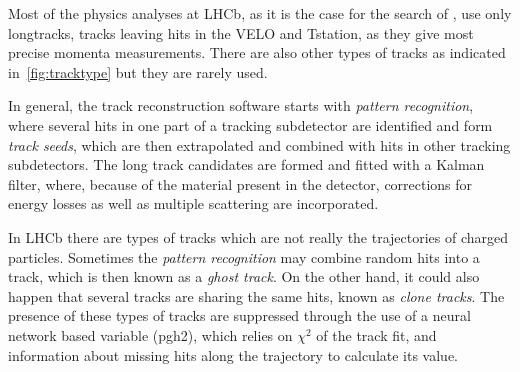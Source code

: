 Most of the physics analyses at \gls{LHCb}, as it is the case for the search of \Bmumumu, use only \gls{longtrack}s, tracks leaving hits in the \Gls{VELO} and \Gls{Tstation}, as they give most precise momenta measurements. There are also other types of tracks as indicated in~\autoref{fig:tracktype} but they are rarely used.

In general, the track reconstruction software starts with \textit{pattern recognition}, where several hits in one part of a tracking subdetector are identified and form \textit{track seeds}, which are then extrapolated and combined with hits in other tracking subdetectors. The long track candidates are formed and fitted with a Kalman filter\cite{Hierk:684697}, where, because of the material present in the detector, corrections for energy losses as well as multiple scattering are incorporated.

In \gls{LHCb} there are types of tracks which are not really the trajectories of charged particles.
Sometimes the \textit{pattern recognition} may combine random hits into a track, which is then known as a \textit{ghost track}. On the other hand, it could also happen that several tracks are sharing the same hits, known as \textit{clone tracks}. The presence of these types of tracks are suppressed through the use of a neural network based variable (\Gls{pgh2}), which relies on $\chi^{2}$ of the track fit, and information about missing hits along the trajectory to calculate its value.

